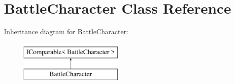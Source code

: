 \hypertarget{class_battle_character}{}\section{Battle\+Character Class Reference}
\label{class_battle_character}
Inheritance diagram for Battle\+Character\+:\begin{figure}[H]
\begin{center}
\leavevmode
\includegraphics[height=2.000000cm]{class_battle_character}
\end{center}
\end{figure}
